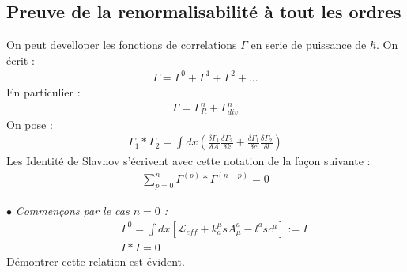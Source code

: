 \documentclass[a4paper,11pt]{article} %
\theoremstyle{plain}
\theoremstyle{definition}
\theoremstyle{remark}
\numberwithin{equation}{section}
\numberwithin{equation}{subsection}
\numberwithin{figure}{section}
\begin{document}
  \subsection{Preuve de la renormalisabilité à tout les ordres}

\noindent
On peut develloper les fonctions de correlations $\Gamma$ en serie de puissance de $\hbar$. On écrit :
\begin{eqnarray*}
 \Gamma = \Gamma^{0} + \Gamma^{1} + \Gamma^{2} + ...
\end{eqnarray*}
En particulier : 
\begin{eqnarray*}
 \Gamma = \Gamma_{R}^{n} + \Gamma^{n}_{div}
\end{eqnarray*}
On pose :
\begin{eqnarray*}
 \Gamma_1 * \Gamma_2 = \int dx \left( \frac{\delta \Gamma_{1}}{\delta A} \frac{\delta \Gamma_{2}}{\delta k} 
+ \frac{\delta \Gamma_{1}}{\delta c} \frac{\delta \Gamma_{2}}{\delta l} \right)
\end{eqnarray*}
Les Identité de Slavnov  s'écrivent avec cette notation de la façon suivante :
\begin{eqnarray*}
 \sum_{p=0}^{n} \Gamma^{(p)} * \Gamma^{(n-p)} = 0
\end{eqnarray*}

\noindent
$\bullet$ \textit{Commençons par le cas $n=0$ :}
\begin{eqnarray*}
 && \Gamma^{0} = \int dx \left[ \mathcal{L}_{eff} + k^{\mu}_{a} s A^{a}_{\mu} - l^{a} s c^{a} \right] := I\\
 && I*I = 0
\end{eqnarray*}
Démontrer cette relation est évident. \\
\end{document}
